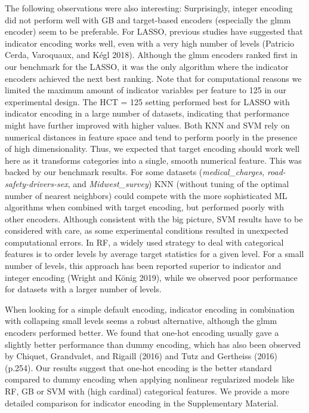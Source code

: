 \documentclass[smallextended]{svjour3}       %
\begin{document}
The following observations were also interesting:
Surprisingly, integer encoding did not perform well with GB and target-based encoders (especially the glmm encoder) seem to be preferable.
For LASSO, previous studies have suggested that indicator encoding works well, even with a very high number of levels (Patricio Cerda, Varoquaux, and Kégl 2018).
Although the glmm encoders ranked first in our benchmark for the LASSO, it was the only algorithm where the indicator encoders achieved the next best ranking.
Note that for computational reasons we limited the maximum amount of indicator variables per feature to 125 in our experimental design.
The HCT = 125 setting performed best for LASSO with indicator encoding in a large number of datasets, indicating that performance might have further improved with higher values.
Both KNN and SVM rely on numerical distances in feature space and tend to perform poorly in the presence of high dimensionality.
Thus, we expected that target encoding should work well here as it transforms categories into a single, smooth numerical feature.
This was backed by our benchmark results.
For some datasets (\emph{medical\_charges}, \emph{road-safety-drivers-sex}, and \emph{Midwest\_survey}) KNN (without tuning of the optimal number of nearest neighbors) could compete with the more sophisticated ML algorithms when combined with target encoding, but performed poorly with other encoders.
Although consistent with the big picture, SVM results have to be considered with care, as some experimental conditions resulted in unexpected computational errors.
In RF, a widely used strategy to deal with categorical features is to order levels by average target statistics for a given level.
For a small number of levels, this approach has been reported superior to indicator and integer encoding (Wright and König 2019), while we observed poor performance for datasets with a larger number of levels.

When looking for a simple default encoding, indicator encoding in combination with collapsing small levels seems a robust alternative, although the glmm encoders performed better.
We found that one-hot encoding usually gave a slightly better performance than dummy encoding, which has also been observed by Chiquet, Grandvalet, and Rigaill (2016) and Tutz and Gertheiss (2016) (p.254).
Our results suggest that one-hot encoding is the better standard compared to dummy encoding when applying nonlinear regularized models like RF, GB or SVM with (high cardinal) categorical features.
We provide a more detailed comparison for indicator encoding in the Supplementary Material.
\end{document}
